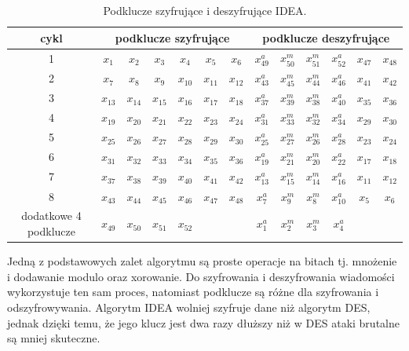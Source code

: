 \documentclass[12p]{article}
\begin{document}
\begin{table}[H]
\centering
\begin{tabular}{|c|c|c|c|c|c|c|c|c|c|c|c|c|}
\hline
cykl & \multicolumn{6}{|c|}{podklucze szyfrujące}  & \multicolumn{6}{|c|}{podklucze deszyfrujące} \\ \hline
1&$x_{1}$&$x_{2}$&$x_{3}$&$x_{4}$&$x_{5}$&$x_{6}$&$x_{49}^{a}$&$x_{50}^{m}$&$x_{51}^{m}$&$x_{52}^{a}$&$x_{47}$&$x_{48}$\\ \hline
2&$x_{7}$&$x_{8}$&$x_{9}$&$x_{10}$&$x_{11}$& $x_{12}$&$x_{43}^{a}$&$x_{45}^{m}$&$x_{44}^{m}$&$x_{46}^{a}$&$x_{41}$&$x_{42}$\\ \hline
3&$x_{13}$&$x_{14}$&$x_{15}$&$x_{16}$&$x_{17}$&$x_{18}$&$x_{37}^{a}$&$x_{39}^{m}$&$x_{38}^{m}$&$x_{40}^{a}$&$x_{35}$&$x_{36}$\\ \hline
4&$x_{19}$&$x_{20}$&$x_{21}$&$x_{22}$&$x_{23}$&$x_{24}$&$x_{31}^{a}$&$x_{33}^{m}$&$x_{32}^{m}$&$x_{34}^{a}$&$x_{29}$&$x_{30}$\\ \hline
5&$x_{25}$&$x_{26}$&$x_{27}$&$x_{28}$&$x_{29}$&$x_{30}$&$x_{25}^{a}$&$x_{27}^{m}$&$x_{26}^{m}$&$x_{28}^{a}$&$x_{23}$&$x_{24}$\\ \hline
6&$x_{31}$&$x_{32}$&$x_{33}$&$x_{34}$&$x_{35}$&$x_{36}$&$x_{19}^{a}$&$x_{21}^{m}$&$x_{20}^{m}$&$x_{22}^{a}$&$x_{17}$&$x_{18}$\\ \hline
7&$x_{37}$&$x_{38}$&$x_{39}$&$x_{40}$&$x_{41}$&$x_{42}$&$x_{13}^{a}$&$x_{15}^{m}$&$x_{14}^{m}$&$x_{16}^{a}$&$x_{11}$&$x_{12}$\\ \hline
8&$x_{43}$&$x_{44}$&$x_{45}$&$x_{46}$&$x_{47}$&$x_{48}$&$x_{7}^{a}$&$x_{9}^{m}$&$x_{8}^{m}$&$x_{10}^{a}$&$x_{5}$&$x_{6}$\\ \hline
dodatkowe 4 podklucze&$x_{49}$&$x_{50}$&$x_{51}$&$x_{52}$&&&$x_{1}^{a}$&$x_{2}^{m}$&$x_{3}^{m}$&$x_{4}^{a}$&&\\ \hline
\end{tabular}
\caption{Podklucze szyfrujące i deszyfrujące IDEA.}\label{podklucze_deszyfrowania_idea}
\end{table}

Jedną z podstawowych zalet algorytmu są proste operacje na bitach tj. mnożenie i dodawanie modulo oraz xorowanie. Do szyfrowania i deszyfrowania wiadomości wykorzystuje ten sam proces, natomiast podklucze są różne dla szyfrowania i odszyfrowywania. Algorytm IDEA wolniej szyfruje dane niż algorytm DES, jednak dzięki temu, że jego klucz jest dwa razy dłuższy niż w DES ataki brutalne są mniej skuteczne.~\cite{IDEA}

\end{document}
